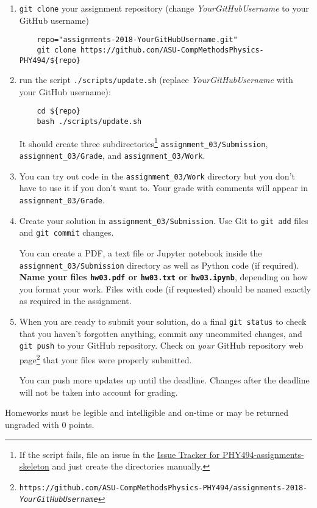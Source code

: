 \documentclass[letterpaper]{scrartcl}
\newcommand{\anumber}{3}
\newcommand{\anum}{0\anumber}
\begin{document}
\begin{enumerate}
\item \texttt{git clone} your assignment repository (change
  \emph{YourGitHubUsername} to your GitHub username)
  \begin{verbatim}
    repo="assignments-2018-YourGitHubUsername.git" 
    git clone https://github.com/ASU-CompMethodsPhysics-PHY494/${repo}
  \end{verbatim}
\item run the script
  \texttt{./scripts/update.sh} (replace \emph{YourGitHubUsername} with
  your GitHub username):
  \begin{verbatim}
    cd ${repo} 
    bash ./scripts/update.sh
  \end{verbatim}
  It should create three subdirectories\footnote{If the script fails,
    file an issue in the
    \href{https://github.com/ASU-CompMethodsPhysics-PHY494/PHY494-assignments-skeleton/issues}{Issue
      Tracker for PHY494-assignments-skeleton} and just create the
    directories manually.} \texttt{assignment\_\anum/Submission},
  \texttt{assignment\_\anum/Grade}, and
  \texttt{assignment\_\anum/Work}.
\item You can try out code in the \texttt{assignment\_\anum/Work}
  directory but you don't have to use it if you don't want to. Your
  grade with comments will appear in
  \texttt{assignment\_\anum/Grade}.
\item Create your solution in
  \texttt{assignment\_\anum/Submission}. Use Git to \texttt{git
    add} files and \texttt{git commit} changes.

  You can create a PDF, a text file or Jupyter notebook inside the
  \texttt{assignment\_\anum/Submission} directory as well as Python
  code (if required). \textbf{Name your files \texttt{hw\anum.pdf} or
    \texttt{hw\anum.txt} or \texttt{hw\anum.ipynb}}, depending on how
  you format your work. Files with code (if requested) should be named
  exactly as required in the assignment.
\item When you are ready to submit your solution, do a final
  \texttt{git status} to check that you haven't forgotten anything,
  commit any uncommited changes, and \texttt{git push} to your GitHub
  repository. Check on \emph{your} GitHub repository web
  page\footnote{\texttt{https://github.com/ASU-CompMethodsPhysics-PHY494/assignments-2018-\emph{YourGitHubUsername}}}
  that your files were properly submitted.

  You can push more updates up until the deadline. Changes after the
  deadline will not be taken into account for grading.
\end{enumerate}
Homeworks must be legible and intelligible and on-time or may  be
returned ungraded with 0 points.
\end{document}
